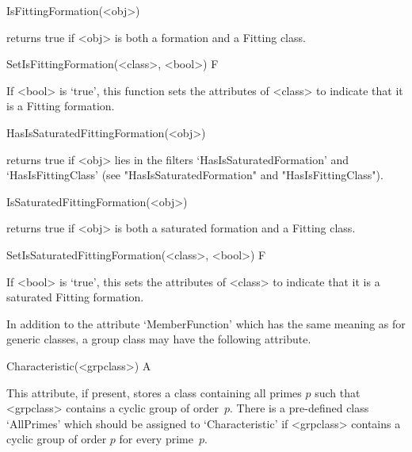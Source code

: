\>IsFittingFormation(<obj>) 

returns true if <obj> is both a formation and a Fitting class.

\>SetIsFittingFormation(<class>, <bool>) F

If <bool> is `true', this function sets the attributes of <class> to indicate
that it is a Fitting formation.

\>HasIsSaturatedFittingFormation(<obj>) 

returns true if <obj> lies in the filters `HasIsSaturatedFormation' and 
`HasIsFittingClass' (see "HasIsSaturatedFormation" and "HasIsFittingClass").

\>IsSaturatedFittingFormation(<obj>) 

returns true if <obj> is both a saturated formation and a Fitting class.

\>SetIsSaturatedFittingFormation(<class>, <bool>) F

If <bool> is `true', this sets the attributes of <class> to indicate that it
is a saturated Fitting formation.


\null


In addition to the attribute `MemberFunction' which has the same meaning as
for generic classes, a group class may have the following attribute.

\>Characteristic(<grpclass>) A

This attribute, if present, stores a class containing all primes $p$ such
that <grpclass> contains a cyclic group of order~$p$. There is a pre-defined
class `AllPrimes' which should be assigned to `Characteristic' if <grpclass>
contains a cyclic group of order $p$ for every prime~$p$.


